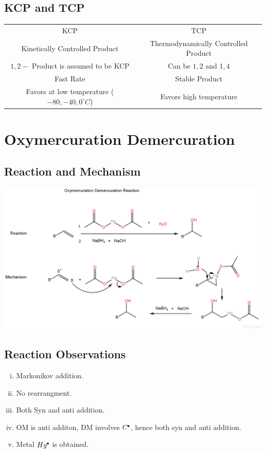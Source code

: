 \documentclass{article}
\newcommand*\fullcirc[1][0.3ex]{\tikz\fill (0,0) circle (#1);}
\begin{document}
\subsection{KCP and TCP}
\begin{center}
    \begin{tabular}{c | c}
        KCP                                                 & TCP                                  \\
        Kinetically Controlled Product                      & Thermodynamically Controlled Product \\
        $1,2-$ Product is assumed to be KCP                 & Can be $1,2 $ and $1,4$              \\
        Fast Rate                                           & Stable Product                       \\
        Favors at low temperature ($-80, -40, 0 ^ \circ C$) & Favors high temperature
    \end{tabular}
\end{center}

\section{Oxymercuration Demercuration}
\subsection{Reaction and Mechanism}
\begin{center}
    \includegraphics[scale=0.22]{OMDM_1722369977375.JPEG}
\end{center}
\subsection{Reaction Observations}
\begin{enumerate}[i.]
    \item Markonikov addition.
    \item No rearrangment.
    \item Both Syn and anti addition.
    \item OM is anti additon, DM involves $C^{\fullcirc}$, hence both syn and anti addition.
    \item Metal $Hg^{\fullcirc}$ is obtained.
\end{enumerate}
\end{document}
